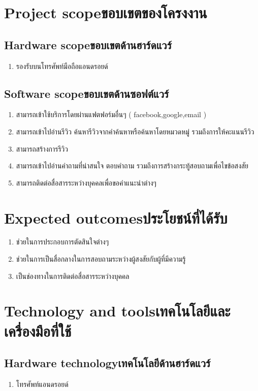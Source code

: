 \section{\ifenglish Project scope\else ขอบเขตของโครงงาน\fi}

\subsection{\ifenglish Hardware scope\else ขอบเขตด้านฮาร์ดแวร์\fi}
\begin{enumerate}
    \item รองรับบนโทรศัพท์มือถือแอนดรอยด์
\end{enumerate}
\subsection{\ifenglish Software scope\else ขอบเขตด้านซอฟต์แวร์\fi}
\begin{enumerate}
    \item สามารถเข้าใช้บริการโดยผ่านแฟตฟอร์มอื่นๆ ( facebook,google,email )
    \item สามารถเข้าไปอ่านรีวิว ค้นหารีวิวจากคําค้นหาหรือค้นหาโดยหมวดหมู่ รวมถึงการให้คะแนนรีวิว
    \item สามารถสร้างการรีวิว
    \item สามารถเข้าไปอ่านคําถามที่น่าสนใจ ตอบคําถาม รวมถึงการสร้างกระทู้สอบถามเพื่อไขข้อสงสัย
    \item สามารถติดต่อสื่อสารระหว่างบุคคลเพื่อขอคําแนะนําต่างๆ
\end{enumerate}
\section{\ifenglish Expected outcomes\else ประโยชน์ที่ได้รับ\fi}
\begin{enumerate}
    \item  ช่วยในการประกอบการตัดสินใจต่างๆ
    \item  ช่วยในการเป็นสื่อกลางในการสอบถามระหว่างผู้สงสัยกับผู้ที่มีความรู้
    \item เป็นช่องทางในการติดต่อสื่อสารระหว่างบุคคล
\end{enumerate}
\section{\ifenglish Technology and tools\else เทคโนโลยีและเครื่องมือที่ใช้\fi}

\subsection{\ifenglish Hardware technology\else เทคโนโลยีด้านฮาร์ดแวร์\fi}
\begin{enumerate}
    \item โทรศัพท์แอนดรอยด์
\end{enumerate}
